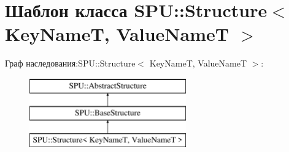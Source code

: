 \hypertarget{class_s_p_u_1_1_structure}{}\section{Шаблон класса S\+PU\+:\+:Structure$<$ Key\+NameT, Value\+NameT $>$}
\label{class_s_p_u_1_1_structure}
Граф наследования\+:S\+PU\+:\+:Structure$<$ Key\+NameT, Value\+NameT $>$\+:\begin{figure}[H]
\begin{center}
\leavevmode
\includegraphics[height=3.000000cm]{class_s_p_u_1_1_structure}
\end{center}
\end{figure}
